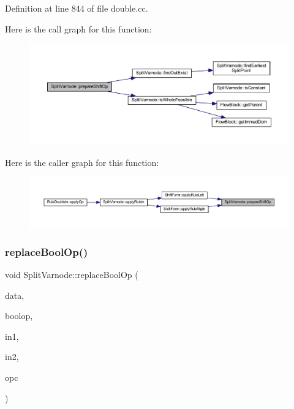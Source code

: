 Definition at line 844 of file double.\+cc.

Here is the call graph for this function\+:
\nopagebreak
\begin{figure}[H]
\begin{center}
\leavevmode
\includegraphics[width=350pt]{class_split_varnode_a5a10435148bcdd7f5e09cface0c1998f_cgraph}
\end{center}
\end{figure}
Here is the caller graph for this function\+:
\nopagebreak
\begin{figure}[H]
\begin{center}
\leavevmode
\includegraphics[width=350pt]{class_split_varnode_a5a10435148bcdd7f5e09cface0c1998f_icgraph}
\end{center}
\end{figure}
\mbox{\label{class_split_varnode_afcb8b8c5221764a535eb066b15149f84}} 
\subsubsection{\texorpdfstring{replaceBoolOp()}{replaceBoolOp()}}
{\footnotesize\ttfamily void Split\+Varnode\+::replace\+Bool\+Op (\begin{DoxyParamCaption}\item[{\mbox{\hyperlink{class_funcdata}{Funcdata}} \&}]{data,  }\item[{\mbox{\hyperlink{class_pcode_op}{Pcode\+Op}} $\ast$}]{boolop,  }\item[{\mbox{\hyperlink{class_split_varnode}{Split\+Varnode}} \&}]{in1,  }\item[{\mbox{\hyperlink{class_split_varnode}{Split\+Varnode}} \&}]{in2,  }\item[{\mbox{\hyperlink{opcodes_8hh_abeb7dfb0e9e2b3114e240a405d046ea7}{Op\+Code}}}]{opc }\end{DoxyParamCaption})\hspace{0.3cm}{\ttfamily [static]}}



